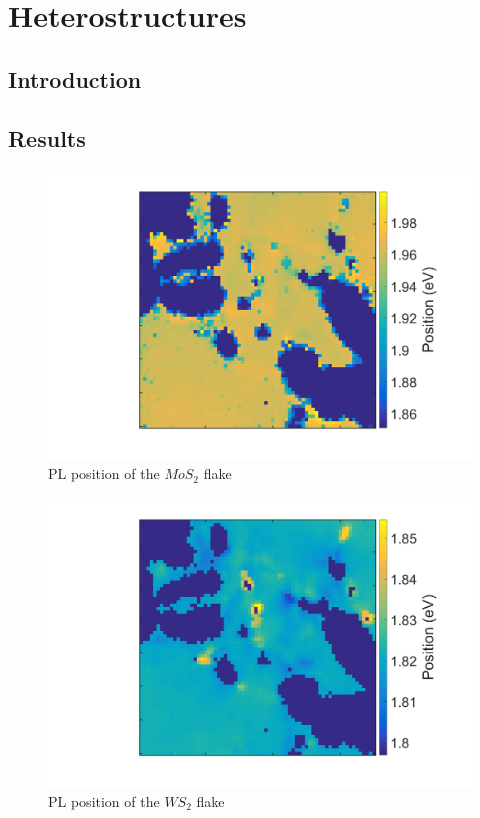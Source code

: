 \section{Heterostructures}

\subsection{Introduction}

\subsection{Results}

\begin{figure}[h]
	\begin{center}
		\includegraphics[scale=0.3]{Heterostructures/PLPositionMap21.png}
		\caption{PL position of the $MoS_2$ flake}
		\label{fig:HeterostructuresPLPosition21Map}
	\end{center}
\end{figure}

\begin{figure}[h]
	\begin{center}
		\includegraphics[scale=0.3]{Heterostructures/PLPositionMap22.png}
		\caption{PL position of the $WS_2$ flake}
		\label{fig:HeterostructuresPLPosition22Map}
	\end{center}
\end{figure}

